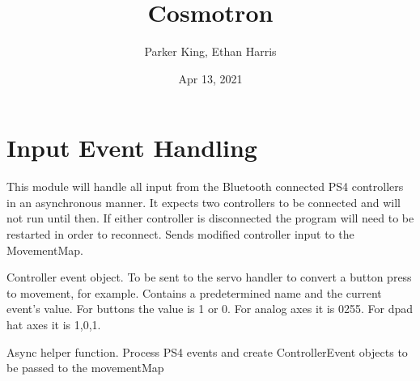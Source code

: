 \documentclass[letterpaper,10pt,english]{sphinxmanual}
\title{Cosmotron}
\date{Apr 13, 2021}
\author{Parker King, Ethan Harris}
\begin{document}
\pagestyle{empty}
\sphinxmaketitle
\pagestyle{plain}
\sphinxtableofcontents
\pagestyle{normal}
\label{\detokenize{index::doc}}



\chapter{Input Event Handling}
\label{\detokenize{input:module-manualControl}}\label{\detokenize{input:input-event-handling}}\label{\detokenize{input::doc}}
\sphinxAtStartPar
This module will handle all input from the Bluetooth connected PS4 controllers in an asynchronous manner. It expects two controllers to be connected 
and will not run until then. If either controller is disconnected the program will need to be restarted in order to reconnect.
Sends modified controller input to the MovementMap.

\begin{fulllineitems}
\label{\detokenize{input:manualControl.ControllerEvent}}
\sphinxAtStartPar
Controller event object. To be sent to the servo handler to convert a button press to movement, for example. 
Contains a predetermined name and the current event’s value. 
For buttons the value is 1 or 0. For analog axes it is 0\sphinxhyphen{}255. For d\sphinxhyphen{}pad hat axes it is \sphinxhyphen{}1,0,1.

\end{fulllineitems}


\begin{fulllineitems}
\label{\detokenize{input:manualControl.process_events}}
\sphinxAtStartPar
Async helper function. Process PS4 events and create ControllerEvent objects to be passed to the movementMap

\end{fulllineitems}
\end{document}
